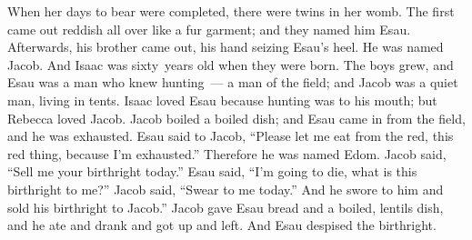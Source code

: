 \begin{inparaenum}
   When her days to bear were completed, there were twins in her womb.%
   The first came out reddish all over like a fur garment; and they named him Esau.%
   Afterwards, his brother came out, his hand seizing Esau's heel. He was named Jacob. And Isaac was sixty~years old when they were born.%
   The boys grew, and Esau was a man who knew hunting~--- a man of the field; and Jacob was a quiet man, living in tents.%
   Isaac loved Esau because hunting was to his mouth; but Rebecca loved Jacob.%
   Jacob boiled a boiled dish; and Esau came in from the field, and he was exhausted.%
   Esau said to Jacob, ``Please let me eat from the red, this red thing, because I'm exhausted.'' Therefore he was named Edom.%
   Jacob said, ``Sell me your birthright today.''%
   Esau said, ``I'm going to die, what is this birthright to me?''%
   Jacob said, ``Swear to me today.'' And he swore to him and sold his birthright to Jacob.''%
   Jacob gave Esau bread and a boiled, lentils dish, and he ate and drank and got up and left. And Esau despised the birthright.%
\end{inparaenum}
